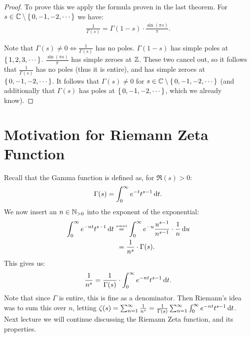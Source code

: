 \begin{proof}
To prove this we apply the formula proven in the last theorem. For $s \in \mathbb{C} \setminus \set{0,-1,-2,\cdots}$ we have:
\begin{align*}
    \frac{1}{\Gamma(s)} = \Gamma(1-s) \cdot \frac{\sin(\pi s)}{\pi}.
\end{align*}

Note that $\Gamma(s) \neq 0 \Leftrightarrow \tfrac{1}{\Gamma(s)}$ has no poles. $\Gamma(1-s)$ has simple poles at $\set{1,2,3, \cdots}$. $\frac{\sin(\pi s)}{\pi}$ has simple zeroes at $\mathbb{Z}$. These two cancel out, so it follows that $\frac{1}{\Gamma(s)}$ has no poles (thus it is entire), and has simple zeroes at $\set{0,-1,-2,\cdots}$. It follows that $\Gamma(s) \neq 0$ for $s \in \mathbb{C} \setminus \set{0,-1,-2,\cdots}$ (and additionally that $\Gamma(s) $ has poles at $\set{0,-1,-2, \cdots}$, which we already know).
\end{proof}




\section{Motivation for Riemann Zeta Function}

Recall that the Gamma function is defined as, for $\Re(s) >0$:
\begin{align*}
    \Gamma(s) = \int_0^\infty e^{-t} t^{s-1} \dif t.
\end{align*}
We now insert an $n \in \mathbb{N}_{>0}$ into the exponent of the exponential:
\begin{align*}
    \int_0^\infty e^{-nt} t^{s-1} \dif t &\overset{{\scriptscriptstyle u = nt}}{=} \int_0^\infty e^{-u} \frac{u^{s-1}}{n^{s-1}} \cdot \frac{1}{n} \dif u\\
    & \, \; = \frac{1}{n^s} \cdot \Gamma(s).
\end{align*}
This gives us:
\begin{align*}
    \frac{1}{n^s} = \frac{1}{\Gamma(s) } \cdot \int_0^\infty e^{-nt} t^{s-1} \dif t.
\end{align*}
Note that since $\Gamma$ is entire, this is fine as a denominator. Then Riemann's idea was to sum this over $n$, letting $\zeta(s) = \sum_{n=1}^\infty \frac{1}{n^s} = \frac{1}{\Gamma(s)} \sum_{n=1}^\infty \int_0^\infty e^{-nt} t^{s-1} \dif t$.\\

Next lecture we will continue discussing the Riemann Zeta function, and its properties.
